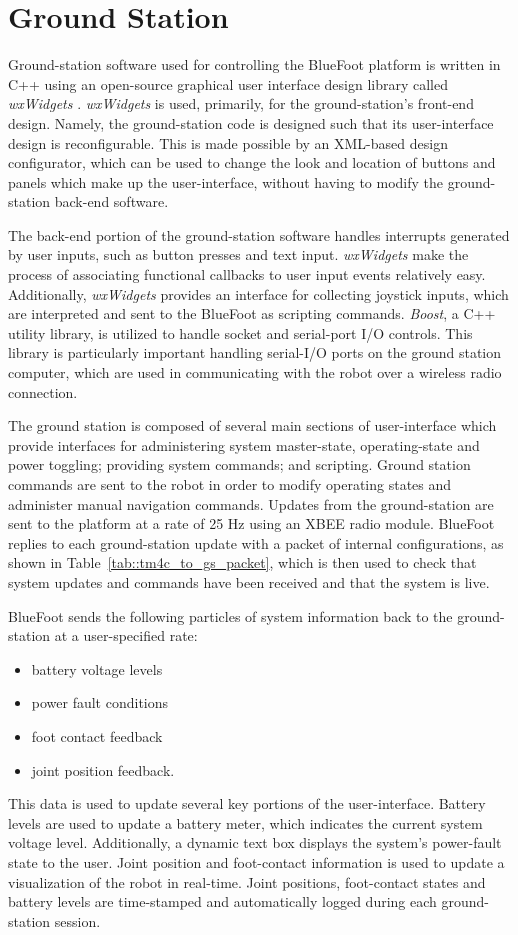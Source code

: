 	\section{Ground Station}
		
		Ground-station software used for controlling the BlueFoot platform is written in C++ using an open-source graphical user interface design library called \emph{wxWidgets} \cite{WX_Website}. \emph{wxWidgets} is used, primarily, for the ground-station's front-end design. Namely, the ground-station code is designed such that its user-interface design is reconfigurable. This is made possible by an XML-based design configurator, which can be used to change the look and location of buttons and panels which make up the user-interface, without having to modify the ground-station back-end software. 

		The back-end portion of the ground-station software handles interrupts generated by user inputs, such as button presses and text input. \emph{wxWidgets} make the process of associating functional callbacks to user input events relatively easy. Additionally, \emph{wxWidgets} provides an interface for collecting joystick inputs, which are interpreted and sent to the BlueFoot as scripting commands. \emph{Boost}, a C++ utility library, is utilized to handle socket and serial-port I/O controls. This library is particularly important handling serial-I/O ports on the ground station computer, which are used in communicating with the robot over a wireless radio connection.

		The ground station is composed of several main sections of user-interface which provide interfaces for administering system master-state, operating-state and power toggling; providing system commands; and scripting. Ground station commands are sent to the robot in order to modify operating states and administer manual navigation commands. Updates from the ground-station are sent to the platform at a rate of 25 Hz using an XBEE radio module. BlueFoot replies to each ground-station update with a packet of internal configurations, as shown in Table~\ref{tab::tm4c_to_gs_packet}, which is then used to check that system updates and commands have been received and that the system is live.

		BlueFoot sends the following particles of system information back to the ground-station at a user-specified rate: 
			\begin{itemize}
				\item battery voltage levels 
				\item power fault conditions 
				\item foot contact feedback
				\item joint position feedback. 
			\end{itemize}
		This data is used to update several key portions of the user-interface. Battery levels are used to update a battery meter, which indicates the current system voltage level. Additionally, a dynamic text box displays the system's power-fault state to the user. Joint position and foot-contact information is used to update a visualization of the robot in real-time. Joint positions, foot-contact states and battery levels are time-stamped and automatically logged during each ground-station session. 

